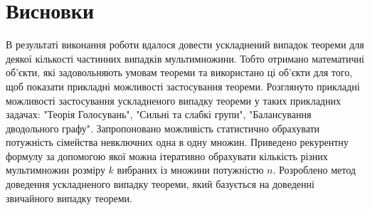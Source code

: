 \chapter*{Висновки}

В результаті виконання роботи вдалося довести ускладнений випадок теореми для деякої кількості частинних випадків мультимножини. Тобто отримано математичні об'єкти, які задовольняють умовам теореми та використано ці об'єкти для того, щоб показати прикладні можливості застосування теореми. Розглянуто прикладні можливості застосування ускладненого випадку теореми у таких прикладних задачах: "Теорія Голосувань", "Сильні та слабкі групи", "Балансування дводольного графу". Запропоновано можливість статистично обрахувати потужність сімейства невключних одна в одну множин. Приведено рекурентну формулу за допомогою якої можна ітеративно обрахувати кількість різних мультимножин розміру $k$ вибраних із множини потужністю $n$. Розроблено метод доведення ускладненого випадку теореми, який базується на доведенні звичайного випадку теореми.
